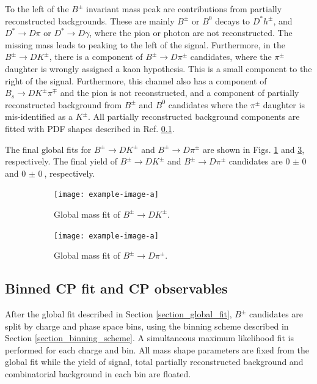 \documentclass[12pt, a4paper, notitlepage, onecolumn]{article}
\numberwithin{equation}{section}
\begin{document}
To the left of the $B^\pm$ invariant mass peak are contributions from partially reconstructed backgrounds. These are mainly $B^\pm$ or $B^0$ decays to $D^*h^\pm$, and $D^*\to D\pi$ or $D^*\to D\gamma$, where the pion or photon are not reconstructed. The missing mass leads to peaking to the left of the signal. Furthermore, in the $B^\pm\to DK^\pm$, there is a component of $B^\pm\to D\pi^\pm$ candidates, where the $\pi^\pm$ daughter is wrongly assigned a kaon hypothesis. This is a small component to the right of the signal. Furthermore, this channel also has a component of $B_s\to DK^\pm\pi^\mp$ and the pion is not reconstructed, and a component of partially reconstructed background from $B^\pm$ and $B^0$ candidates where the $\pi^\pm$ daughter is mis-identified as a $K^\pm$. All partially reconstructed background components are fitted with PDF shapes described in Ref. \ref{}.

The final global fits for $B^\pm\to DK^\pm$ and $B^\pm\to D\pi^\pm$ are shown in Figs. \ref{fig_Bmass_B2DK} and \ref{fig_Bmass_B2Dpi}, respectively. The final yield of $B^\pm\to DK^\pm$ and $B^\pm\to D\pi^\pm$ candidates are $\SI{0(0)}{}$ and $\SI{0(0)}{}$, respectively.

\begin{figure}[H] 
  \centering
  \begin{subfigure}{0.5\textwidth}
    \centering
    \texttt{[image: example-image-a]}
    \caption{Global mass fit of $B^\pm\to DK^\pm$.}
    \label{fig_Bmass_B2DK}
  \end{subfigure}%
  \begin{subfigure}{0.5\textwidth}
    \centering
    \texttt{[image: example-image-a]}
    \caption{Global mass fit of $B^\pm\to D\pi^\pm$.}
    \label{fig_Bmass_B2Dpi}
  \end{subfigure}
  \caption{}
\end{figure}

\subsection{Binned CP fit and CP observables}
\noindent After the global fit described in Section \ref{section_global_fit}, $B^\pm$ candidates are split by charge and phase space bins, using the binning scheme described in Section \ref{section_binning_scheme}. A simultaneous maximum likelihood fit is performed for each charge and bin. All mass shape parameters are fixed from the global fit while the yield of signal, total partially reconstructed background and combinatorial background in each bin are floated.
\end{document}
